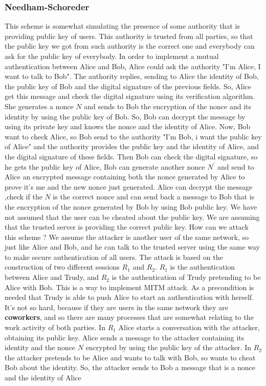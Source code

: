 \documentclass[11pt]{article}
\begin{document}
\subsubsection{Needham-Schoreder}
This scheme is somewhat simulating the presence of some authority that is providing public key of users. This authority is trusted from all parties, so that the public key we got from such authority is the correct one and everybody can ask for the public key of everybody. In order to implement a mutual authentication between Alice and Bob, Alice could ask the authority "I'm Alice, I want to talk to Bob". The authority replies, sending to Alice the identity of Bob, the public key of Bob and the digital signature of the previous fields. So, Alice get this message and check the digital signature using its verification algorithm. She generates a nonce $N$ and sends to Bob the encryption of the nonce and its identity by using
the public key of Bob. So, Bob can decrypt the message by using its private key and knows the nonce and the identity of Alice. Now, Bob want to check Alice, so Bob send to the authority  "I'm Bob, i want the public key of Alice" and the authority provides the public key and the identity of Alice, and the digital signature of these fields. Then Bob can check the digital signature, so he gets the public key of Alice, Bob can generate another nonce $N^{'}$ and send to Alice an encrypted message containing both the nonce generated by Alice to prove it's me and the new nonce just generated. Alice can decrypt the message ,check if the $N$ is the correct nonce and can send back a message to Bob that is the encryption of the nonce generated by Bob by using Bob public key. We have not assumed that the user can be cheated about the public key. We are assuming that the trusted server is providing the correct public key. How can we attack this scheme ? We assume the attacker is another user of the same network, so just like Alice and Bob, and he can talk to the trusted server using the same way to make secure authentication of all users. The attack is based on the construction of two different sessions $R_1$ and $R_2$. $R_1$ is the authentication between Alice and Trudy, and $R_2$ is the authentication of Trudy pretending to be Alice with Bob. This is a way to implement MITM attack. As a precondition is needed that Trudy is able to push Alice to start an authentication with herself. It's not so hard, because if they are users in the same network they are \textbf{coworkers}, and so there are many processes that are somewhat relating to the work activity of both parties. In $R_1$ Alice starts a conversation with the attacker, obtaining its public key. Alice sends a message to the attacker containing its identity and the nonce $N$ encrypted by using the public key of the attacker. In $R_2$ the attacker pretends to be Alice and wants to talk with Bob, so wants to cheat Bob about the identity. So, the attacker sends to Bob a message that is a nonce and the identity of Alice
\end{document}
